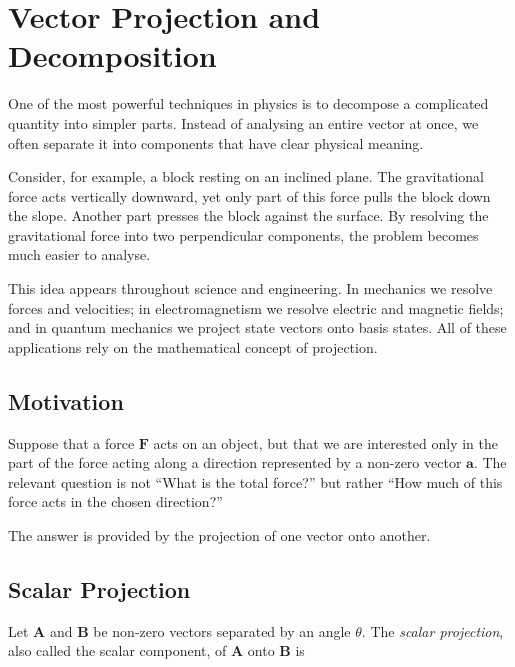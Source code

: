 
\section{Vector Projection and Decomposition}
\label{sec:vector-projection-decomposition}

One of the most powerful techniques in physics is to decompose a complicated
quantity into simpler parts. Instead of analysing an entire vector at once, we
often separate it into components that have clear physical meaning.

Consider, for example, a block resting on an inclined plane. The gravitational
force acts vertically downward, yet only part of this force pulls the block
down the slope. Another part presses the block against the surface. By resolving
the gravitational force into two perpendicular components, the problem becomes
much easier to analyse.

This idea appears throughout science and engineering. In mechanics we resolve
forces and velocities; in electromagnetism we resolve electric and magnetic
fields; and in quantum mechanics we project state vectors onto basis states.
All of these applications rely on the mathematical concept of projection.

\subsection{Motivation}

Suppose that a force $\mathbf F$ acts on an object, but that we are interested
only in the part of the force acting along a direction represented by a non-zero
vector $\mathbf a$. The relevant question is not ``What is the total force?''
but rather ``How much of this force acts in the chosen direction?''

The answer is provided by the projection of one vector onto another.

\subsection{Scalar Projection}

Let $\mathbf A$ and $\mathbf B$ be non-zero vectors separated by an angle
$\theta$. The \emph{scalar projection}, also called the scalar component, of
$\mathbf A$ onto $\mathbf B$ is

